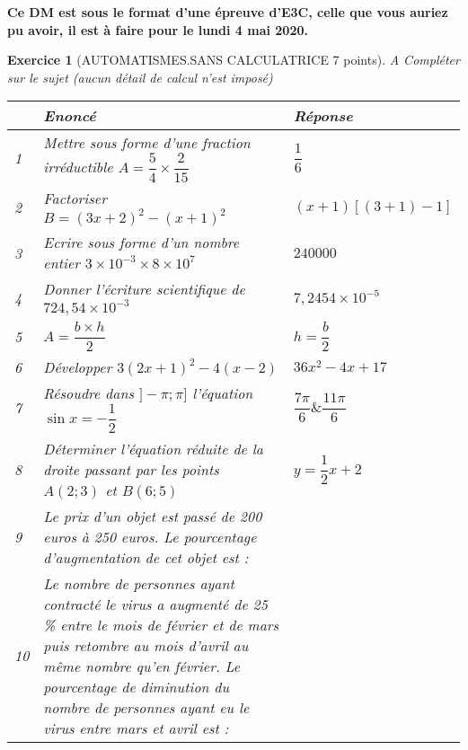 \documentclass[11pt,a4paper]{article}
\renewcommand{\arraystretch}{1}
\theoremstyle{break}
\newtheorem{exo}{Exercice}
\begin{document}
	\textbf{Ce DM est sous le format d'une épreuve d'E3C, celle que vous auriez pu avoir, il est à faire pour le lundi 4 mai 2020.}
\begin{exo}[AUTOMATISMES.SANS CALCULATRICE 7  points] 
 A Compléter sur le sujet (aucun détail de calcul n'est imposé)\\
{\renewcommand{\arraystretch}{2}
\begin{tabular}{|p{1cm}|p{10cm}|p{5.5cm}| }
	\hline
&Enoncé&Réponse\\
\hline
1&Mettre sous forme d'une fraction irréductible $A= \dfrac54 \times \dfrac2{15}$& $\dfrac16$\\
\hline
2&Factoriser $B= (3x+2)^2 - (x+1)^2$& $(x+1)[(3+1) - 1 ]$\\
\hline
3&Ecrire sous forme d'un nombre entier $3\times10^{-3}\times8\times10^7$& $240000$\\
\hline
4&Donner l'écriture scientifique de $724,54 \times 10^{-3}$&$7,2454\times 10^{-5} $\\
\hline
5& $A=\dfrac{b\times h}{2}$ & $h=\dfrac{b}2$\\
\hline
6&Développer $3(2x+1)^2-4(x-2)$&$36x^2 - 4x +17$\\
\hline
7& Résoudre dans $]-\pi ; \pi]$ l'équation $\sin x = -\dfrac12$ & $\dfrac {7\pi}6 \& \dfrac {11\pi}6 $\\
\hline
8& Déterminer l'équation réduite  de la droite passant par les points $A(2 ; 3)$ et $B( 6 ; 5)$ & $y = \dfrac12 x + 2 $  \\
\hline
9&Le prix d'un objet est passé de 200 euros à 250 euros. Le pourcentage d'augmentation de cet objet est : & \\
\hline
10& Le nombre de personnes ayant contracté le virus a augmenté de 25 \% entre le mois de février et de mars puis retombre au mois d'avril au même nombre qu'en février. Le pourcentage de diminution du nombre de personnes ayant eu le virus entre mars et avril est : & \\
\hline

\end{tabular}}

\end{exo}
\newpage
\end{document}
